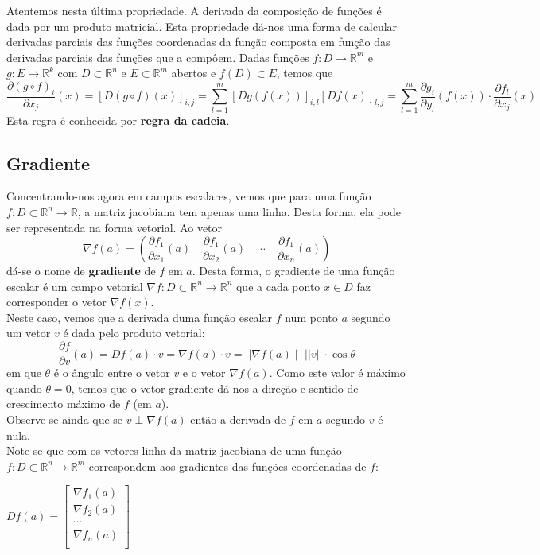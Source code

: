 \documentclass{article}
\begin{document}
Atentemos nesta última propriedade. A derivada da composição de funções é dada por um produto matricial. Esta propriedade dá-nos uma forma de calcular derivadas parciais das funções coordenadas da função composta em função das derivadas parciais das funções que a compôem. Dadas funções $f: D \to \mathbb{R}^m$ e $g: E \to \mathbb{R}^k$ com $D \subset \mathbb{R}^n$ e $E \subset \mathbb{R}^m$ abertos e $f(D) \subset E$, temos que
$$
\frac{\partial (g \circ f)_i }{\partial x_j}(x) = \left[ D(g \circ f)(x) \right]_{i,j} = \sum_{l=1}^m \left[ Dg(f(x)) \right]_{i,l} \left[ Df(x) \right]_{l,j} = \sum_{l=1}^m \frac{\partial g_i}{\partial y_l}(f(x)) \cdot \frac{\partial f_l}{\partial x_j}(x)
$$
Esta regra é conhecida por \textbf{regra da cadeia}.\\

\subsection{Gradiente}
Concentrando-nos agora em campos escalares, vemos que para uma função $f: D \subset \mathbb{R}^n \to \mathbb{R}$, a matriz jacobiana tem apenas uma linha. Desta forma, ela pode ser representada na forma vetorial. Ao vetor
$$
\nabla f(a) = \left( \frac{\partial f_1}{\partial x_1}(a) \quad \frac{\partial f_1}{\partial x_2}(a) \quad \cdots \quad \frac{\partial f_1}{\partial x_n}(a) \right)
$$
dá-se o nome de \textbf{gradiente} de $f$ em $a$. Desta forma, o gradiente de uma função escalar é um campo vetorial $\nabla f: D \subset \mathbb{R}^n \to \mathbb{R}^n$ que a cada ponto $x \in D$ faz corresponder o vetor $\nabla f(x)$.\\
Neste caso, vemos que a derivada duma função escalar $f$ num ponto $a$ segundo um vetor $v$ é dada pelo produto vetorial:
$$
\frac{\partial f}{\partial v}(a) = Df(a) \cdot v = \nabla f(a) \cdot v = || \nabla f(a) || \cdot ||v|| \cdot \cos \theta
$$
em que $\theta$ é o ângulo entre o vetor $v$ e o vetor $\nabla f(a)$. Como este valor é máximo quando $\theta = 0$, temos que o vetor gradiente dá-nos a direção e sentido de crescimento máximo de $f$ (em $a$).\\
Observe-se ainda que se $v \perp \nabla f(a)$ então a derivada de $f$ em $a$ segundo $v$ é nula.\\
Note-se que com os vetores linha da matriz jacobiana de uma função $f: D \subset \mathbb{R}^n \to \mathbb{R}^m$ correspondem aos gradientes das funções coordenadas de $f$:
\begin{center}$
Df(a) =
\begin{bmatrix}
\nabla f_1(a) \\
\nabla f_2(a) \\
\cdots \\
\nabla f_n(a) \\
\end{bmatrix}$
\end{center}
\end{document}
